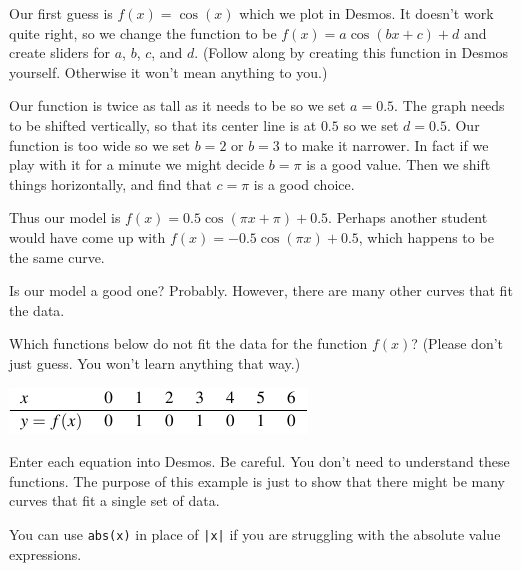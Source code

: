 \documentclass{ximera}
\begin{document}
Our first guess is $f(x)=\cos(x)$ which we plot in Desmos. It doesn't work quite right, so we change the function to be $f(x)=a\cos(bx+c)+d$ and create sliders for $a$, $b$, $c$, and $d$. (Follow along by creating this function in Desmos yourself. Otherwise it won't mean anything to you.)


Our function is twice as tall as it needs to be so we set $a=0.5$. The graph needs to be shifted vertically, so that its center line is at $0.5$ so we set $d=0.5$. Our function is too wide so we set $b=2$ or $b=3$ to make it narrower. In fact if we play with it for a minute we might decide $b=\pi$ is a good value. Then we shift things horizontally, and find that $c=\pi$ is a good choice.

Thus our model is $f(x)=0.5\cos(\pi x+\pi)+0.5$. Perhaps another student would have come up with $f(x)=-0.5\cos(\pi x)+0.5$, which happens to be the same curve. 

Is our model a good one? Probably. However, there are many other curves that fit the data.

\begin{question}
Which functions below do not fit the data for the function $f(x)$? (Please don't just guess. You won't learn anything that way.)

\begin{image}
\includegraphics{ModelingTable2.png} 
\end{image}

    \begin{multipleChoice}
    \end{multipleChoice}
    \begin{hint}
    Enter each equation into Desmos. Be careful. You don't need to understand these functions. The purpose of this example is just to show that there might be many curves that fit a single set of data.
    \end{hint}
    \begin{hint}
    You can use \verb|abs(x)| in place of \verb+|x|+ if you are struggling with the absolute value expressions. 
    \end{hint}

\end{question}
\end{document}
